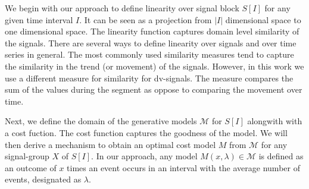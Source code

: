 We begin with our approach to define linearity over 
signal block $S[I]$ for any given time interval $I$.
It can be seen as a projection from $|I|$ dimensional
space to  one dimensional space. 
The  linearity function captures domain level
similarity  of the signals. 
There are several ways to define linearity over signals
and over time series in general.
The most commonly used similarity measures tend to capture
the similarity in the trend (or movement) of the signals.
However, in this work we use a different measure for similarity
for dv-signals. The measure compares the sum of the values
during the segment as oppose to comparing the movement over time.

Next, we define the domain of the generative  models $\mathcal M$ for $S[I]$ alongwith
with a cost fuction. The cost function captures the goodness of the model.
We will then derive a mechanism to obtain an optimal cost model $M$ from $\mathcal M$
for any signal-group $X$ of $S[I]$.
In our approach, any model $M(x,\lambda)\in \mathcal M$
is defined as an outcome of $x$ times an event occurs in an interval with the average number of events, designated as $\lambda$.



